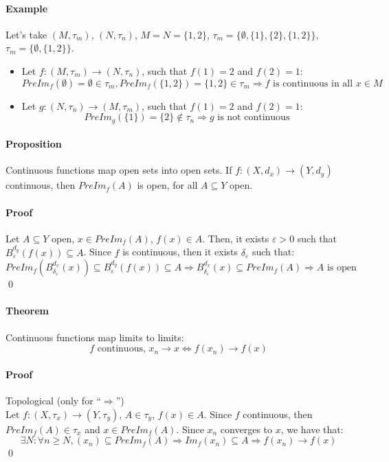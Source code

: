 \documentclass{article}
\newcommand{\func}[3]{#1 : #2 \rightarrow #3}
\newcommand{\Ep}{\varepsilon}
\newcommand{\Proposition}{\paragraph{Proposition}}
\newcommand{\Theorem}{\paragraph{Theorem}}
\newcommand{\Proof}{\paragraph{Proof}}
\newcommand{\Example}{\paragraph{Example}}
\begin{document}
	\Example Let's take $(M,\tau_m)$, $(N,\tau_n)$, $M = N = \{ 1, 2 \}$,
	$\tau_m = \{ \emptyset, \{ 1 \}, \{ 2 \}, \{ 1, 2 \} \}$, $\tau_m = \{
	\emptyset, \{ 1, 2 \} \}$.
	\begin{itemize}
		\item Let $\func{f}{(M,\tau_m)}{(N,\tau_n)}$, such that $f(1) = 2$ and $f(2)
		= 1$:
		\begin{equation*}
			PreIm_f(\emptyset) = \emptyset \in \tau_m,
			PreIm_f(\{ 1, 2 \}) = \{ 1, 2 \} \in \tau_m \Rightarrow
			f \text{ is continuous in all } x \in M
		\end{equation*}
		\item Let $\func{g}{(N,\tau_n)}{(M,\tau_m)}$, such that $f(1) = 2$ and $f(2)
		= 1$:
		\begin{equation*}
			PreIm_g(\{ 1 \}) = \{ 2 \} \notin \tau_n \Rightarrow
			g \text{ is not continuous}
		\end{equation*}
	\end{itemize}

	\Proposition Continuous functions map open sets into open sets. If
	$\func{f}{(X,d_x)}{(Y,d_y)}$ continuous, then $PreIm_f(A)$ is open, for all
	$A \subseteq Y$ open.

	\Proof Let $A \subseteq Y$ open, $x \in PreIm_f(A)$, $f(x) \in A$. Then, it
	exists $\Ep > 0$ such that $B_\Ep^{d_y}(f(x)) \subseteq A$. Since
	$f$ is continuous, then it exists $\delta_\Ep$ such that:
	\begin{equation*}
		PreIm_f(B_{\delta_\Ep}^{d_x}(x)) \subseteq B_\Ep^{d_y}(f(x))
		\subseteq A \Rightarrow B_{\delta_\Ep}^{d_x}(x) \subseteq PreIm_f(A)
		\Rightarrow A \text{ is open}
	\end{equation*}
	\qed

	\Theorem Continuous functions map limits to limits:
	\begin{equation*}
		f \text{ continuous, } x_n \to x \iff f(x_n) \to f(x)
	\end{equation*}

	\Proof Topological (only for ``$\Rightarrow$'')
\\Let $\func{f}{(X,\tau_x)}{(Y,\tau_y)}$, $A \in \tau_y$, $f(x) \in A$. Since
	$f$ continuous, then $PreIm_f(A) \in \tau_x$ and $x \in PreIm_f(A)$. Since
	$x_n$ converges to $x$, we have that:
	\begin{equation*}
		\exists N : \forall n \geq N, (x_n) \subseteq PreIm_f(A) \Rightarrow
		Im_f(x_n) \subseteq A \Rightarrow f(x_n) \to f(x)
	\end{equation*}
	\qed
\end{document}
